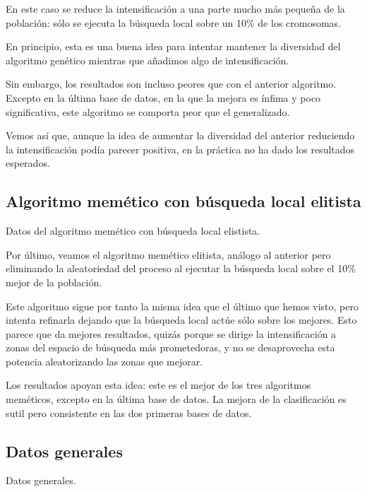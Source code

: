 \documentclass[a4paper, 11pt, titlepage]{article}
\begin{document}
    En este caso se reduce la intensificación a una parte mucho más pequeña de la población: sólo se ejecuta la búsqueda local sobre un 10\% de los cromosomas.

    En principio, esta es una buena idea para intentar mantener la diversidad del algoritmo genético mientras que añadimos algo de intensificación.

    Sin embargo, los resultados son incluso peores que con el anterior algoritmo. Excepto en la última base de datos, en la que la mejora es ínfima y poco significativa, este algoritmo se comporta peor que el generalizado.

    Vemos así que, aunque la idea de aumentar la diversidad del anterior reduciendo la intensificación podía parecer positiva, en la práctica no ha dado los resultados esperados.

    \subsection{Algoritmo memético con búsqueda local elitista}
    \begin{table}[!htb]
        \maketable{\dataAMTZM}
        \caption{Datos del algoritmo memético con búsqueda local elistista.}
        \label{tablaAMTZM}
    \end{table}

    Por último, veamos el algoritmo memético elitista, análogo al anterior pero eliminando la aleatoriedad del proceso al ejecutar la búsqueda local sobre el 10\% mejor de la población.

    Este algoritmo sigue por tanto la misma idea que el último que hemos visto, pero intenta refinarla dejando que la búsqueda local actúe sólo sobre los mejores. Esto parece que da mejores resultados, quizás porque se dirige la intensificación a zonas del espacio de búsqueda más prometedoras, y no se desaprovecha esta potencia aleatorizando las zonas que mejorar.

    Los resultados apoyan esta idea: este es el mejor de los tres algoritmos meméticos, excepto en la última base de datos. La mejora de la clasificación es sutil pero consistente en las dos primeras bases de datos.

    \subsection{Datos generales}
    \begin{table}[!htb]
        \maketablemean{\dataMedias}
        \caption{Datos generales.}
        \label{medias}
    \end{table}
\end{document}

